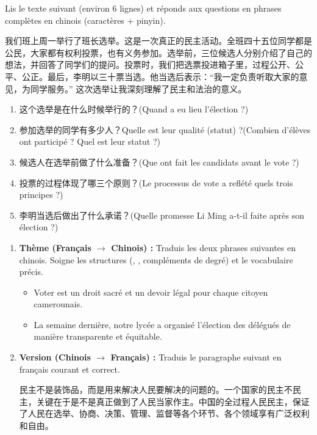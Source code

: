\documentclass[11pt]{article}
\newcommand{\zh}[1]{\ifmmode\text{#1}\else{#1}\fi}
\begin{document}
\begin{exercice}
Lis le texte suivant (environ 6 lignes) et réponds aux questions en phrases complètes en chinois (caractères + pinyin).

\begin{textebox}
我们班上周一举行了班长选举。这是一次真正的民主活动。全班四十五位同学都是公民，大家都有权利投票，也有义务参加。选举前，三位候选人分别介绍了自己的想法，并回答了同学们的提问。投票时，我们把选票投进箱子里，过程公开、公平、公正。最后，李明以三十票当选。他当选后表示：``我一定负责听取大家的意见，为同学服务。'' 这次选举让我深刻理解了民主和法治的意义。
\end{textebox}

\begin{enumerate}
    \item 这个选举是在什么时候举行的？(Quand a eu lieu l'élection ?)
    \item 参加选举的同学有多少人？Quelle est leur qualité (statut) ?(Combien d'élèves ont participé ? Quel est leur statut ?)
    \item 候选人在选举前做了什么准备？(Que ont fait les candidats avant le vote ?)
    \item 投票的过程体现了哪三个原则？(Le processus de vote a reflété quels trois principes ?)
    \item 李明当选后做出了什么承诺？(Quelle promesse Li Ming a-t-il faite après son élection ?)
\end{enumerate}
\end{exercice}

\begin{exercice}
\begin{enumerate}
    \item \textbf{Thème (Français $\rightarrow$ Chinois) :} Traduis les deux phrases suivantes en chinois. Soigne les structures (\zh{是……的}, \zh{把}, compléments de degré) et le vocabulaire précis.
    \begin{itemize}
        \item[a.] Voter est un droit sacré et un devoir légal pour chaque citoyen camerounais.
        \item[b.] La semaine dernière, notre lycée a organisé l'élection des délégués de manière transparente et équitable.
    \end{itemize}
    \item \textbf{Version (Chinois $\rightarrow$ Français) :} Traduis le paragraphe suivant en français courant et correct.
    \begin{textebox}
    民主不是装饰品，而是用来解决人民要解决的问题的。一个国家的民主不民主，关键在于是不是真正做到了人民当家作主。中国的全过程人民民主，保证了人民在选举、协商、决策、管理、监督等各个环节、各个领域享有广泛权利和自由。
    \end{textebox}
\end{enumerate}
\end{exercice}
\end{document}
